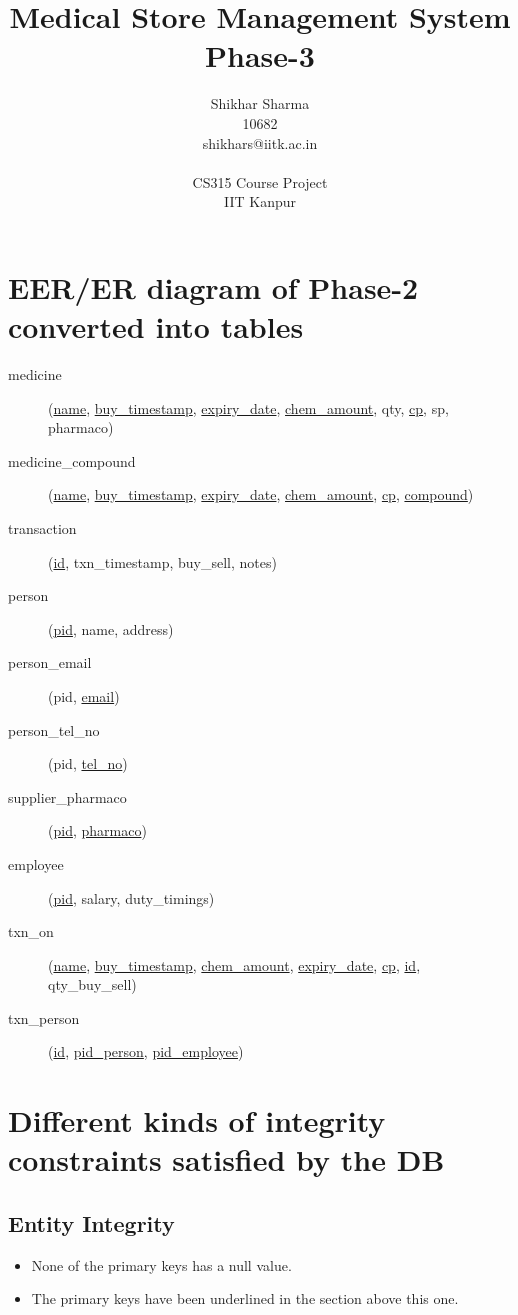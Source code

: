 \documentclass[a4papaer]{article}
\title{{\bf Medical Store Management System}\\Phase-3}
\author{Shikhar Sharma\\10682\\shikhars@iitk.ac.in\\\\CS315 Course Project\\IIT Kanpur}
\begin{document}
\maketitle
\tableofcontents

\newpage
\section{EER/ER diagram of Phase-2 converted into tables}
	\begin{description}
		\item[medicine] (\underline{name}, \underline{buy\_timestamp}, \underline{expiry\_date}, \underline{chem\_amount}, qty, \underline{cp}, sp, pharmaco)
		\item[medicine\_compound] (\underline{name}, \underline{buy\_timestamp}, \underline{expiry\_date}, \underline{chem\_amount}, \underline{cp}, \underline{compound})
		\item[transaction] (\underline{id}, txn\_timestamp, buy\_sell, notes)
		\item[person] (\underline{pid}, name, address)
		\item[person\_email] (pid, \underline{email})
		\item[person\_tel\_no] (pid, \underline{tel\_no})
		\item[supplier\_pharmaco] (\underline{pid}, \underline{pharmaco})
		\item[employee] (\underline{pid}, salary, duty\_timings)
		\item[txn\_on] (\underline{name}, \underline{buy\_timestamp}, \underline{chem\_amount}, \underline{expiry\_date}, \underline{cp}, \underline{id}, qty\_buy\_sell)
		\item[txn\_person] (\underline{id}, \underline{pid\_person}, \underline{pid\_employee})
	\end{description}

\section{Different kinds of integrity constraints satisfied by the DB}
	\subsection{Entity Integrity}
		\begin{itemize}
			\item None of the primary keys has a null value.
			\item The primary keys have been underlined in the section above this one.
		\end{itemize}
\end{document}
